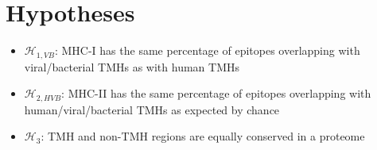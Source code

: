 \section{Hypotheses}


\begin{itemize}
  \item $\mathcal{H}_{1,VB}$: MHC-I has the same percentage of epitopes overlapping
    with viral/bacterial TMHs as with human TMHs
  \item $\mathcal{H}_{2,HVB}$: MHC-II has the same percentage of epitopes overlapping
    with human/viral/bacterial TMHs as expected by chance
  \item $\mathcal{H}_{3}$: TMH and non-TMH regions are equally conserved
    in a proteome
\end{itemize}

